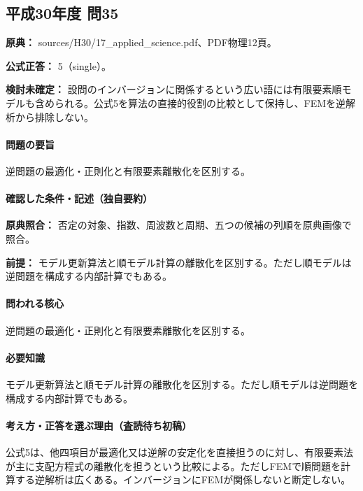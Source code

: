 \subsection{平成30年度 問35}
\label{q:h30-reg-applied-35}

\noindent\textbf{原典：} sources/H30/17\_applied\_science.pdf、PDF物理12頁。

\textbf{公式正答：} 5（single）。

\par\textbf{検討未確定：} 設問のインバージョンに関係するという広い語には有限要素順モデルも含められる。公式5を算法の直接的役割の比較として保持し、FEMを逆解析から排除しない。

\paragraph{問題の要旨} 逆問題の最適化・正則化と有限要素離散化を区別する。

\paragraph{確認した条件・記述（独自要約）}\mbox{}\par

\noindent\textbf{原典照合：} 否定の対象、指数、周波数と周期、五つの候補の列順を原典画像で照合。\par

\noindent\textbf{前提：} モデル更新算法と順モデル計算の離散化を区別する。ただし順モデルは逆問題を構成する内部計算でもある。\par

\paragraph{問われる核心} 逆問題の最適化・正則化と有限要素離散化を区別する。

\paragraph{必要知識} モデル更新算法と順モデル計算の離散化を区別する。ただし順モデルは逆問題を構成する内部計算でもある。

\paragraph{考え方・正答を選ぶ理由（査読待ち初稿）} 公式5は、他四項目が最適化又は逆解の安定化を直接担うのに対し、有限要素法が主に支配方程式の離散化を担うという比較による。ただしFEMで順問題を計算する逆解析は広くある。インバージョンにFEMが関係しないと断定しない。

